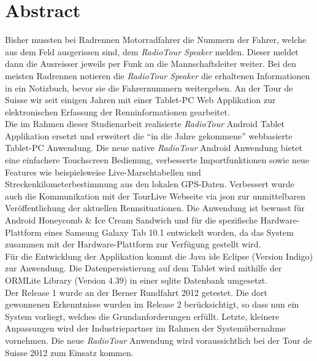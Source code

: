 \chapter*{Abstract}

Bisher mussten bei Radrennen Motorradfahrer die Nummern der Fahrer, welche aus dem Feld ausgerissen sind, dem \textit{RadioTour Speaker} melden. Dieser meldet dann die Ausreisser jeweils per Funk an die Mannschaftsleiter weiter. Bei den meisten Radrennen notieren die \textit{RadioTour Speaker} die erhaltenen Informationen in ein Notizbuch, bevor sie die Fahrernummern weitergeben. An der Tour de Suisse wir seit einigen Jahren mit einer Tablet-PC Web Applikation zur elektronischen Erfassung der Renninformationen gearbeitet.
\\
Die im Rahmen dieser Studienarbeit realisierte \textit{RadioTour} Android Tablet Applikation ersetzt und erweitert die "`in die Jahre gekommene"' webbasierte Tablet-PC Anwendung. Die neue native \textit{RadioTour} Android Anwendung bietet eine einfachere Touchscreen Bedienung, verbesserte Importfunktionen sowie neue Features wie beispielsweise Live-Marschtabellen und Streckenkilometerbestimmung aus den lokalen GPS-Daten. Verbessert wurde auch die Kommunikation mit der TourLive Webseite via \gls{json} zur unmittelbaren Veröffentlichung der aktuellen Rennsituationen. Die Anwendung ist bewusst für Android Honeycomb \& Ice Cream Sandwich und für die  spezifische Hardware-Plattform eines Samsung Galaxy Tab 10.1 entwickelt worden, da das System zusammen mit der Hardware-Plattform zur Verfügung gestellt wird.
\\
Für die Entwicklung der Applikation kommt die Java \gls{ide} Eclipse (Version Indigo) zur Anwendung. Die Datenpersistierung auf dem Tablet wird mithilfe der ORMLite Library (Version 4.39) in einer \gls{sqlite} Datenbank umgesetzt.
\\
Der Release 1 wurde an der Berner Rundfahrt 2012 getestet. Die dort gewonnenen Erkenntnisse wurden im Release 2 berücksichtigt, so dass nun ein System vorliegt, welches die Grundanforderungen erfüllt. Letzte, kleinere Anpassungen wird der Industriepartner im Rahmen der Systemübernahme vornehmen. Die neue \textit{RadioTour} Anwendung wird voraussichtlich bei der Tour de Suisse 2012 zum Einsatz kommen.
